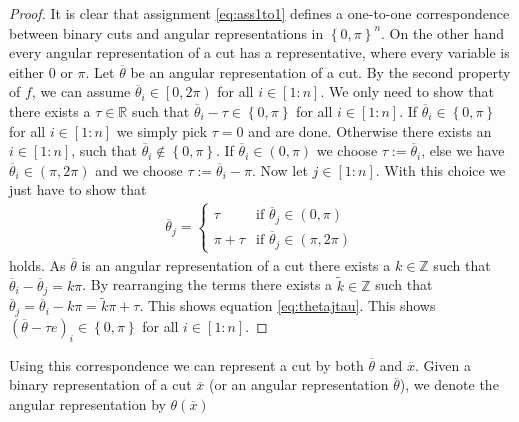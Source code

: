 \documentclass[12pt,a4paper]{article}
\theoremstyle{mythm}
\begin{document}
\begin{proof}
It is clear that assignment \ref{eq:ass1to1} defines a one-to-one correspondence between binary cuts and angular representations in $ \left\{ 0, \pi  \right\} ^{ n }  $.
On the other hand every angular representation of a cut has a representative, where every variable is either $ 0 $ or $ \pi $.
Let $ \overline{ \theta}   $ be an angular representation of a cut. 
By the second property of $ f $, we can assume $ \overline{ \theta}_i  \in \left[ 0, 2 \pi \right)  $ for all $ i \in \left[ 1:n \right]  $.
We only need to show that there exists a $ \tau \in \mathbb{R} $ such that $ \overline{ \theta }_i - \tau \in \left\{ 0, \pi  \right\}	$ for all $ i \in \left[ 1:n \right] $.
If $ \overline{ \theta } _{ i } \in \left\{ 0, \pi  \right\}  $ for all $ i \in \left[ 1:n \right]  $ we simply pick $ \tau = 0 $ and are done.
Otherwise there exists an $ i \in \left[ 1:n \right]  $, such that $ \overline{ \theta  }_i \notin \left\{ 0, \pi  \right\}  $. 
If $ \overline{ \theta }_i \in \left( 0 , \pi  \right)  $ we choose $ \tau := \overline{ \theta }_i  $, else we have $ \overline{ \theta } _{ i } \in \left( \pi , 2 \pi
\right)  $ and we choose $ \tau := \overline{ \theta } _{ i } - \pi $.
Now let $ j \in \left[ 1:n \right]  $. 
With this choice we just have to show that 
\begin{align}
\label{eq:thetajtau} 
 \overline{ \theta } _{ j } = \begin{cases}
 \tau  & \text{if } \overline{ \theta } _{ j } \in \left( 0, \pi \right) \\
 \pi + \tau  & \text{if } \overline{ \theta } _{ j } \in \left( \pi, 2 \pi \right) 
 \end{cases}
\end{align} 
holds.
As $ \overline{ \theta }  $ is an angular representation of a cut there exists a $ k \in \mathbb{Z} $ such that 
$ \overline{ \theta } _{ i } - \overline{ \theta } _{ j } = k \pi   $. By rearranging the terms there exists a $ \widetilde{ k } \in \mathbb{Z} $ such that  
$ \overline{ \theta } _{ j } = \overline{ \theta } _{ i } - k \pi = \widetilde{ k } \pi + \tau $.
This shows equation \ref{eq:thetajtau}. 
This shows $ \left( \overline{ \theta } - \tau e  \right) _{ i } \in \left\{ 0, \pi  \right\}  $ for all $ i \in \left[ 1:n \right]  $.
\end{proof}
Using this correspondence we can represent a cut by both $ \overline{ \theta }  $ and $ \overline{ x }  $. Given a binary representation of a cut $ \overline{ x }  $ (or an
angular representation $ \overline{ \theta }  $), we denote the angular representation by $ \theta ( \overline{ x } ) $ 
\end{document}
